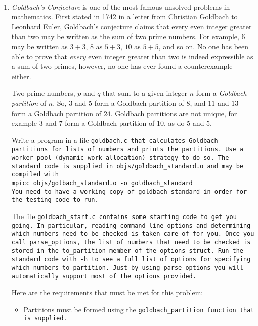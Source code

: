 \documentclass{article}
\begin{document}
\\
\begin{enumerate}

\item \textit{Goldbach's Conjecture} is one of the most famous
  unsolved problems in mathematics.  First stated in 1742 in a letter
  from Christian Goldbach to Leonhard Euler, Goldbach's conjecture
  claims that every even integer greater than two  may be
  written as the sum of two prime numbers.  For example, $6$ may be
  written as $3+3$, $8$ as $5+3$, $10$ as $5+5$, and so on. No one has
  been able to prove that \textit{every} even integer greater than two
  is indeed expressible as a sum of two primes, however, no one has
  ever found a counterexample either. 

  Two prime numbers, $p$ and $q$ that sum to a given integer $n$ form a \textit{Goldbach partition}
  of $n$.  So, $3$ and $5$ form a Goldbach partition of $8$, and $11$
  and $13$ form a Goldbach partition of $24$.  Goldbach partitions are
  not unique, for example $3$ and $7$ form a Goldbach partition of
  $10$, as do $5$ and $5$. 

  Write a program in a file \tt{goldbach.c} that calculates Goldbach partitions for lists of
  numbers and prints the partitions.  Use a worker pool (dynamic work
  allocation) strategy to do so.  The standard code is supplied in
  \tt{objs/goldbach\_standard.o} and may be compiled with\\ 
  \tt{mpicc objs/golbach\_standard.o -o goldbach\_standard}\\
  You need to have a working copy of \tt{goldbach\_standard} in order
  for the testing code to run. 

  The file \tt{goldbach\_start.c} contains some starting code to get
  you going.  In particular, reading command line options and
  determining which numbers need to be checked is taken care of for
  you.  Once you call \tt{parse\_options}, the list of numbers that
  need to be checked is stored in the \tt{to\_partition} member of the
  \tt{options} struct. Run the standard code with \tt{-h} to see a
  full list of options for specifying which numbers to partition.
  Just by using \tt{parse\_options} you will automatically support
  most of the options provided.  

  Here are the requirements that must be met for this problem:
  \begin{itemize}
  \item Partitions must be formed using the \tt{goldbach\_partition}
    function that is supplied. 


\end{itemize}
\end{enumerate}
\end{document}
